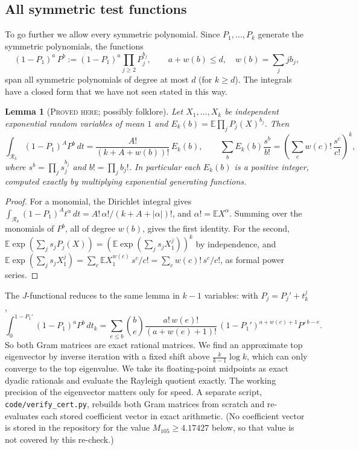 \documentclass[11pt]{amsart}
\newtheorem{lemma}[theorem]{Lemma}
\theoremstyle{definition}
\theoremstyle{remark}
\newcommand{\lbl}[1]{\textup{\textsc{#1}}}
\newcommand{\R}{\mathcal{R}}
\begin{document}
\subsection{All symmetric test functions}
To go further we allow every symmetric polynomial. Since $P_1,\dots,P_k$
generate the symmetric polynomials, the functions
\[
(1-P_1)^a\,P^{b}:=(1-P_1)^a\prod_{j\ge2}P_j^{b_j},\qquad a+w(b)\le d,\quad w(b)=\sum_j jb_j,
\]
span all symmetric polynomials of degree at most $d$ (for $k\ge d$). The
integrals have a closed form that we have not seen stated in this way.

\begin{lemma}[\lbl{Proved here}; possibly folklore]\label{lem:egf}
Let $X_1,\dots,X_k$ be independent exponential random variables of mean $1$
and $E_k(b)=\mathbb E\prod_jP_j(X)^{b_j}$. Then
\[
\int_{\R_k}(1-P_1)^AP^{b}\,dt=\frac{A!}{(k+A+w(b))!}\,E_k(b),
\qquad
\sum_b E_k(b)\frac{s^b}{b!}=\left(\sum_{c}w(c)!\,\frac{s^c}{c!}\right)^{k},
\]
where $s^b=\prod_js_j^{b_j}$ and $b!=\prod_jb_j!$. In particular each
$E_k(b)$ is a positive integer, computed exactly by multiplying
exponential generating functions.
\end{lemma}

\begin{proof}
For a monomial, the Dirichlet integral gives
$\int_{\R_k}(1-P_1)^At^\alpha\,dt=A!\,\alpha!/(k+A+|\alpha|)!$, and
$\alpha!=\mathbb EX^\alpha$. Summing over the monomials of $P^b$, all of
degree $w(b)$, gives the first identity. For the second,
$\mathbb E\exp(\sum_js_jP_j(X))=\left(\mathbb E\exp(\sum_js_jX_1^j)\right)^k$
by independence, and
$\mathbb E\exp(\sum_js_jX_1^j)=\sum_c\mathbb E X_1^{w(c)}\,s^c/c!=\sum_cw(c)!\,s^c/c!$,
as formal power series.
\end{proof}

The $J$-functional reduces to the same lemma in $k-1$ variables: with
$P_j=P_j'+t_k^j$,
\[
\int_0^{1-P_1'}(1-P_1)^aP^b\,dt_k=\sum_{e\le b}\binom{b}{e}
\frac{a!\,w(e)!}{(a+w(e)+1)!}\,(1-P_1')^{a+w(e)+1}P'^{\,b-e}.
\]
So both Gram matrices are exact rational matrices. We find an approximate top
eigenvector by inverse iteration with a fixed shift above
$\frac{k}{k-1}\log k$, which can only converge to the top eigenvalue. We take
its floating-point midpoints as exact dyadic rationals and evaluate the
Rayleigh quotient exactly. The working precision of the eigenvector matters
only for speed. A separate script, \texttt{code/verify\_cert.py}, rebuilds
both Gram matrices from scratch and re-evaluates each stored coefficient
vector in exact arithmetic. (No coefficient vector is stored in the
repository for the value $M_{105}\ge4.17427$ below, so that value is not
covered by this re-check.)
\end{document}
